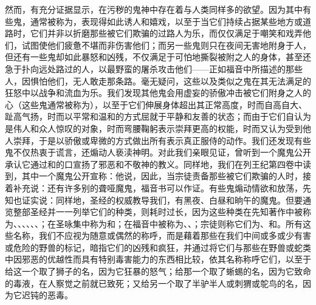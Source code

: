然而，有充分证据显示，在污秽的鬼神中存在着与人类同样多的欲望。因为其中有些鬼，通常被称为，表现得如此诱人和嬉戏，以至于当它们持续占据某些地方或道路时，它们并非以折磨那些被它们欺骗的过路人为乐，而仅仅满足于嘲笑和戏弄他们，试图使他们疲惫不堪而非伤害他们；而另一些鬼则只在夜间无害地附身于人，但还有一些鬼却如此暴怒和凶残，不仅满足于可怕地撕裂被附之人的身体，甚至还急于扑向远处路过的人，以最野蛮的屠杀攻击他们——正如福音中所描述的那些人，因惧怕他们，无人敢走那条路。毫无疑问，这些以及类似之鬼在其无法满足的狂怒中以战争和流血为乐。我们发现其他鬼会用虚妄的骄傲冲击被它们附身之人的心（这些鬼通常被称为），以至于它们伸展身体超出其正常高度，时而自高自大、趾高气扬，时而以平常和温和的方式屈就于平静和友善的状态；而由于它们自认为是伟人和众人惊叹的对象，时而弯腰鞠躬表示崇拜更高的权能，时而又认为受到他人崇拜，于是以骄傲或卑微的方式做出所有表示真正服侍的动作。我们还发现有些鬼不仅热衷于谎言，还煽动人亵渎神明。对此我们亲眼见证，曾听到一个魔鬼公开承认它通过和的口宣扬了邪恶和不敬神的教义。同样地，我们在列王纪第四卷中读到，其中一个魔鬼公开宣称：他说，因此，当宗徒责备那些被它们欺骗的人时，接着补充说：还有许多别的聋哑魔鬼，福音书可以作证。有些鬼煽动情欲和放荡，先知也证实说：同样地，圣经的权威教导我们，有黑夜、白昼和晌午的魔鬼。但要通览整部圣经并一一列举它们的种类，则耗时过长，因为这些种类在先知著作中被称为、、、、、、；在圣咏集中称为和；在福音中被称为、、；宗徒则称它们为、和。所有这些名称，我们不应视为随意或偶然的称呼，而是藉着那些在我们中间或多或少有害或危险的野兽的标记，暗指它们的凶残和疯狂，并通过将它们与那些在野兽或蛇类中因邪恶的优越性而具有特别毒害能力的东西相比较，依其名称称呼它们，以至于给这一个取了狮子的名，因为它狂暴的怒气；给那一个取了蜥蜴的名，因为它致命的毒液，在人察觉之前就已致死；又给另一个取了半驴半人或刺猬或鸵鸟的名，因为它迟钝的恶毒。\par

